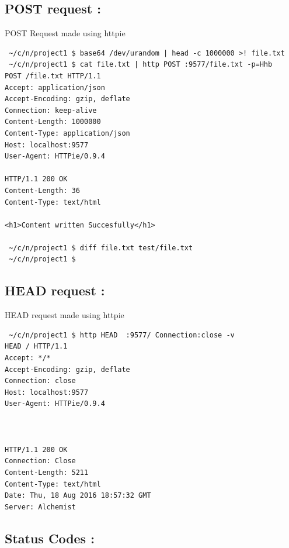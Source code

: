 \documentclass[11pt]{article}
\begin{document}
\newpage
\subsection{POST request :}
\label{sec:orgheadline15}
\label{orgtarget3}
\noindent POST Request made using httpie 

\begin{verbatim}
 ~/c/n/project1 $ base64 /dev/urandom | head -c 1000000 >! file.txt
 ~/c/n/project1 $ cat file.txt | http POST :9577/file.txt -p=Hhb
POST /file.txt HTTP/1.1
Accept: application/json
Accept-Encoding: gzip, deflate
Connection: keep-alive
Content-Length: 1000000
Content-Type: application/json
Host: localhost:9577
User-Agent: HTTPie/0.9.4

HTTP/1.1 200 OK
Content-Length: 36
Content-Type: text/html

<h1>Content written Succesfully</h1>

 ~/c/n/project1 $ diff file.txt test/file.txt
 ~/c/n/project1 $
\end{verbatim}

\subsection{HEAD request :}
\label{sec:orgheadline18}
\label{orgtarget4}
HEAD request made using httpie
\begin{verbatim}
 ~/c/n/project1 $ http HEAD  :9577/ Connection:close -v
HEAD / HTTP/1.1
Accept: */*
Accept-Encoding: gzip, deflate
Connection: close
Host: localhost:9577
User-Agent: HTTPie/0.9.4



HTTP/1.1 200 OK
Connection: Close
Content-Length: 5211
Content-Type: text/html
Date: Thu, 18 Aug 2016 18:57:32 GMT
Server: Alchemist
\end{verbatim}

\newpage
\subsection{Status Codes :}
\label{sec:orgheadline21}
\end{document}
